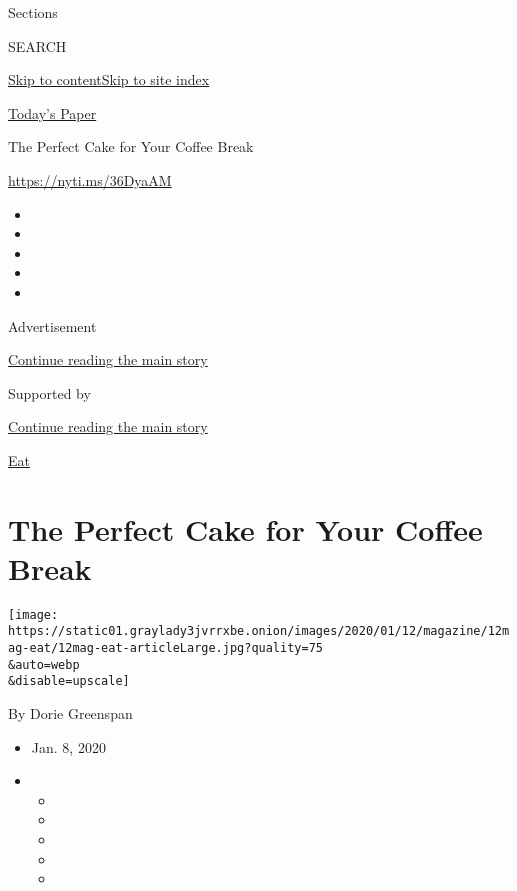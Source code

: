 Sections

SEARCH

\protect\hyperlink{site-content}{Skip to
content}\protect\hyperlink{site-index}{Skip to site index}

\href{https://myaccount.nytimes3xbfgragh.onion/auth/login?response_type=cookie\&client_id=vi}{}

\href{https://www.nytimes3xbfgragh.onion/section/todayspaper}{Today's
Paper}

The Perfect Cake for Your Coffee Break

\url{https://nyti.ms/36DyaAM}

\begin{itemize}
\item
\item
\item
\item
\item
\end{itemize}

Advertisement

\protect\hyperlink{after-top}{Continue reading the main story}

Supported by

\protect\hyperlink{after-sponsor}{Continue reading the main story}

\href{/column/magazine-eat}{Eat}

\hypertarget{the-perfect-cake-for-your-coffee-break}{%
\section{The Perfect Cake for Your Coffee
Break}\label{the-perfect-cake-for-your-coffee-break}}

\texttt{[image: https://static01.graylady3jvrrxbe.onion/images/2020/01/12/magazine/12mag-eat/12mag-eat-articleLarge.jpg?quality=75\\\&auto=webp\\\&disable=upscale]}

By Dorie Greenspan

\begin{itemize}
\item
  Jan. 8, 2020
\item
  \begin{itemize}
  \item
  \item
  \item
  \item
  \item
  \end{itemize}
\end{itemize}

